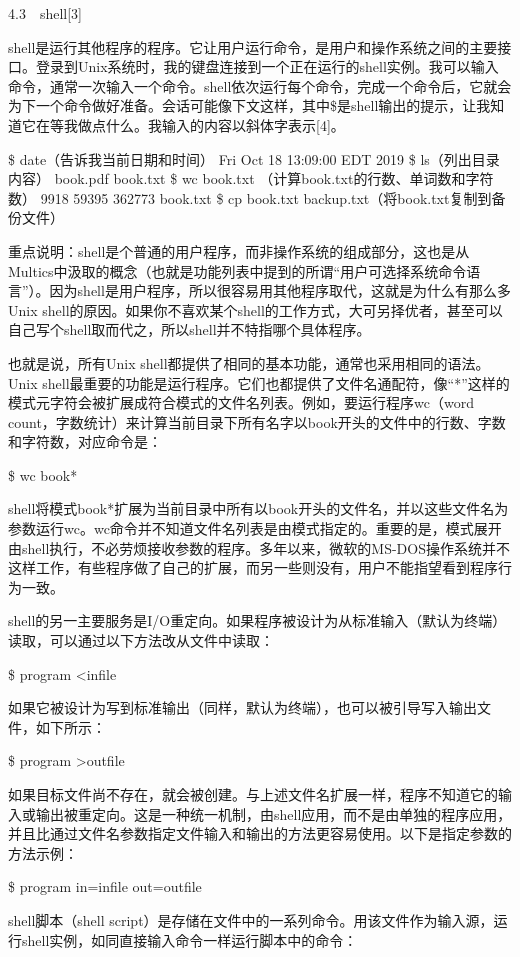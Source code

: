 \documentclass[a4paper,12pt,UTF8,twoside]{ctexbook}
\begin{document}
{4.3　shell[3]


shell是运行其他程序的程序。它让用户运行命令，是用户和操作系统之间的主要接口。登录到Unix系统时，我的键盘连接到一个正在运行的shell实例。我可以输入命令，通常一次输入一个命令。shell依次运行每个命令，完成一个命令后，它就会为下一个命令做好准备。会话可能像下文这样，其中\$是shell输出的提示，让我知道它在等我做点什么。我输入的内容以斜体字表示[4]。

\$ date（告诉我当前日期和时间） Fri Oct 18 13:09:00 EDT 2019 \$ ls（列出目录内容） book.pdf book.txt \$ wc book.txt （计算book.txt的行数、单词数和字符数） 9918 59395 362773 book.txt \$ cp book.txt backup.txt（将book.txt复制到备份文件）

重点说明：shell是个普通的用户程序，而非操作系统的组成部分，这也是从Multics中汲取的概念（也就是功能列表中提到的所谓“用户可选择系统命令语言”）。因为shell是用户程序，所以很容易用其他程序取代，这就是为什么有那么多Unix shell的原因。如果你不喜欢某个shell的工作方式，大可另择优者，甚至可以自己写个shell取而代之，所以shell并不特指哪个具体程序。

也就是说，所有Unix shell都提供了相同的基本功能，通常也采用相同的语法。Unix shell最重要的功能是运行程序。它们也都提供了文件名通配符，像“*”这样的模式元字符会被扩展成符合模式的文件名列表。例如，要运行程序wc（word count，字数统计）来计算当前目录下所有名字以book开头的文件中的行数、字数和字符数，对应命令是：

\$ wc book*

shell将模式book*扩展为当前目录中所有以book开头的文件名，并以这些文件名为参数运行wc。wc命令并不知道文件名列表是由模式指定的。重要的是，模式展开由shell执行，不必劳烦接收参数的程序。多年以来，微软的MS-DOS操作系统并不这样工作，有些程序做了自己的扩展，而另一些则没有，用户不能指望看到程序行为一致。

shell的另一主要服务是I/O重定向。如果程序被设计为从标准输入（默认为终端）读取，可以通过以下方法改从文件中读取：

\$ program <infile

如果它被设计为写到标准输出（同样，默认为终端），也可以被引导写入输出文件，如下所示：

\$ program >outfile

如果目标文件尚不存在，就会被创建。与上述文件名扩展一样，程序不知道它的输入或输出被重定向。这是一种统一机制，由shell应用，而不是由单独的程序应用，并且比通过文件名参数指定文件输入和输出的方法更容易使用。以下是指定参数的方法示例：

\$ program in=infile out=outfile

shell脚本（shell script）是存储在文件中的一系列命令。用该文件作为输入源，运行shell实例，如同直接输入命令一样运行脚本中的命令：

}
\end{document}
